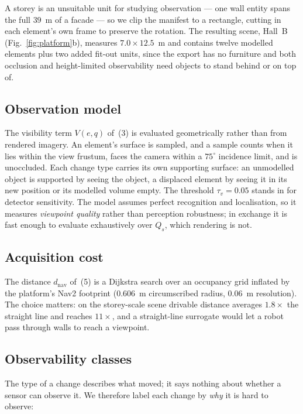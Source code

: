 \documentclass[letterpaper, 10 pt, conference]{ieeeconf}
\begin{document}
A storey is an unsuitable unit for studying observation --- one wall entity
spans the full $39$~m of a facade --- so we clip the manifest to a rectangle,
cutting in each element's own frame to preserve the rotation. The resulting
scene, Hall~B (Fig.~\ref{fig:platform}b), measures $7.0 \times 12.5$~m and
contains twelve modelled elements plus two added fit-out units, since the
export has no furniture and both occlusion and height-limited observability
need objects to stand behind or on top of.

\subsection{Observation model}

The visibility term $V(e,q)$ of~(3) is evaluated geometrically rather than from
rendered imagery. An element's surface is sampled, and a sample counts when it
lies within the view frustum, faces the camera within a $75^\circ$ incidence
limit, and is unoccluded. Each change type carries its own supporting surface:
an unmodelled object is supported by seeing the object, a displaced element by
seeing it in its new position or its modelled volume empty. The threshold
$\tau_v = 0.05$ stands in for detector sensitivity. The model assumes perfect
recognition and localisation, so it measures \emph{viewpoint quality} rather
than perception robustness; in exchange it is fast enough to evaluate
exhaustively over $Q_s$, which rendering is not.

\subsection{Acquisition cost}

The distance $d_{\mathrm{nav}}$ of~(5) is a Dijkstra search over an occupancy
grid inflated by the platform's Nav2 footprint ($0.606$~m circumscribed radius,
$0.06$~m resolution). The choice matters: on the storey-scale scene drivable
distance averages $1.8\times$ the straight line and reaches $11\times$, and a
straight-line surrogate would let a robot pass through walls to reach a
viewpoint.

\subsection{Observability classes}

The type of a change describes what moved; it says nothing about whether a
sensor can observe it. We therefore label each change by \emph{why} it is hard
to observe:
\end{document}
